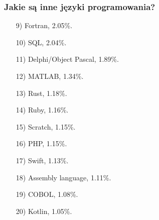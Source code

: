 \documentclass[10pt,t]{beamer}
\begin{document}
\begin{frame}
  \frametitle{Jakie są inne języki programowania?}


  \begin{itemize}

  \item[9)] Fortran, 2.05\%.

  \item[10)] SQL, 2.04\%.

  \item[11)] Delphi/Object Pascal, 1.89\%.

  \item[12)] MATLAB, 1.34\%.

  \item[13)] Rust, 1.18\%.

  \item[14)] Ruby, 1.16\%.

  \item[15)] Scratch, 1.15\%.

  \item[16)] PHP, 1.15\%.

  \item[17)] Swift, 1.13\%.

  \item[18)] Assembly language, 1.11\%.

  \item[19)] COBOL, 1.08\%.

  \item[20)] Kotlin, 1.05\%.

  \end{itemize}

\end{frame}

























\end{document}
